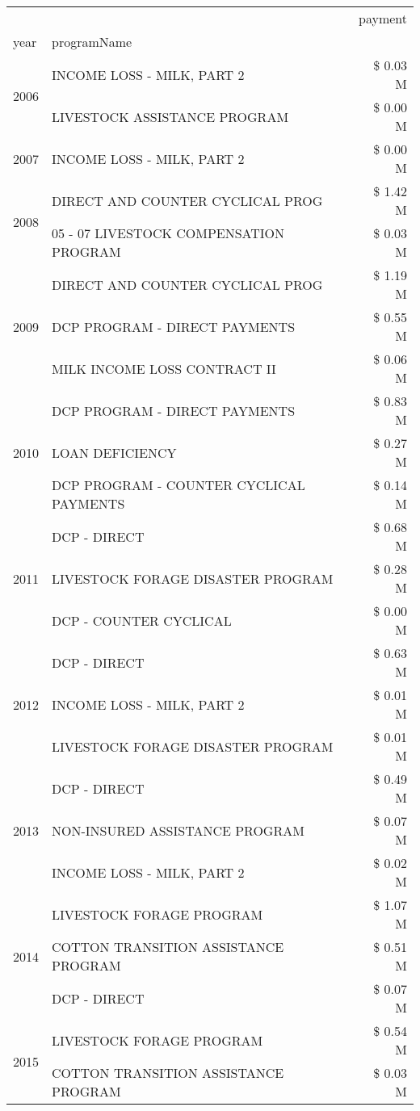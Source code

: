 \begin{tabular}{llr}
\toprule
 &  & payment \\
year & programName &  \\
\midrule
\multirow[t]{2}{*}{2006} & INCOME LOSS - MILK, PART 2 & \$ 0.03 M \\
 & LIVESTOCK ASSISTANCE PROGRAM & \$ 0.00 M \\
\cline{1-3}
2007 & INCOME LOSS - MILK, PART 2 & \$ 0.00 M \\
\cline{1-3}
\multirow[t]{2}{*}{2008} & DIRECT AND COUNTER CYCLICAL PROG & \$ 1.42 M \\
 & 05 - 07 LIVESTOCK COMPENSATION PROGRAM & \$ 0.03 M \\
\cline{1-3}
\multirow[t]{3}{*}{2009} & DIRECT AND COUNTER CYCLICAL PROG & \$ 1.19 M \\
 & DCP PROGRAM - DIRECT PAYMENTS & \$ 0.55 M \\
 & MILK INCOME LOSS CONTRACT II & \$ 0.06 M \\
\cline{1-3}
\multirow[t]{3}{*}{2010} & DCP PROGRAM - DIRECT PAYMENTS & \$ 0.83 M \\
 & LOAN DEFICIENCY & \$ 0.27 M \\
 & DCP PROGRAM - COUNTER CYCLICAL PAYMENTS & \$ 0.14 M \\
\cline{1-3}
\multirow[t]{3}{*}{2011} & DCP - DIRECT & \$ 0.68 M \\
 & LIVESTOCK FORAGE DISASTER PROGRAM & \$ 0.28 M \\
 & DCP - COUNTER CYCLICAL & \$ 0.00 M \\
\cline{1-3}
\multirow[t]{3}{*}{2012} & DCP - DIRECT & \$ 0.63 M \\
 & INCOME LOSS - MILK, PART 2 & \$ 0.01 M \\
 & LIVESTOCK FORAGE DISASTER PROGRAM & \$ 0.01 M \\
\cline{1-3}
\multirow[t]{3}{*}{2013} & DCP - DIRECT & \$ 0.49 M \\
 & NON-INSURED ASSISTANCE PROGRAM & \$ 0.07 M \\
 & INCOME LOSS - MILK, PART 2 & \$ 0.02 M \\
\cline{1-3}
\multirow[t]{3}{*}{2014} & LIVESTOCK FORAGE PROGRAM & \$ 1.07 M \\
 & COTTON TRANSITION ASSISTANCE PROGRAM & \$ 0.51 M \\
 & DCP - DIRECT & \$ 0.07 M \\
\cline{1-3}
\multirow[t]{3}{*}{2015} & LIVESTOCK FORAGE PROGRAM & \$ 0.54 M \\
 & COTTON TRANSITION ASSISTANCE PROGRAM & \$ 0.03 M \\

\end{tabular}
